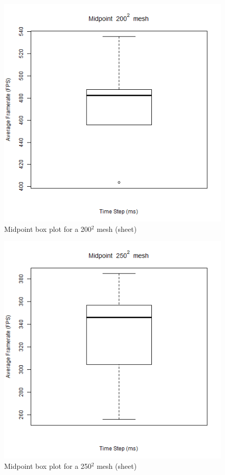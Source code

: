       \begin{figure}
    \begin{center}
      \includegraphics[scale=.9]{Figures/sheet_m_200_box}
    \end{center}
    \caption{Midpoint box plot for a 200$^{2}$ mesh (sheet)}
    \label{fig:m box 200 sheet}
  \end{figure}
  
      \begin{figure}
    \begin{center}
      \includegraphics[scale=.9]{Figures/sheet_m_250_box}
    \end{center}
    \caption{Midpoint box plot for a 250$^{2}$ mesh (sheet)}
    \label{fig:m box 250 sheet}
  \end{figure}
  
